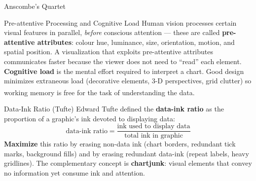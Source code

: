 \begin{v3topic}{Anscombe's Quartet}
\begin{center}
\label{fig:viz-anscombe}
    \end{center}

\end{v3topic}
\begin{v3topic}{Pre-attentive Processing and Cognitive Load}
    Human vision processes certain visual features in parallel, \emph{before} conscious
    attention --- these are called \textbf{pre-attentive attributes}: colour hue, luminance,
    size, orientation, motion, and spatial position. A visualization that exploits
    pre-attentive attributes communicates faster because the viewer does not need to
    ``read'' each element.
    \textbf{Cognitive load} is the mental effort required to interpret a chart.
    Good design minimizes extraneous load (decorative elements, 3-D perspectives, grid
    clutter) so working memory is free for the task of understanding the
    data\textsuperscript{\cite[][pp.~25--40]{jansenHandbuchInfografik1999}}.

\end{v3topic}
\begin{v3topic}{Data-Ink Ratio (Tufte)}
    Edward Tufte defined the \textbf{data-ink ratio} as the proportion of a graphic's ink
    devoted to displaying data:
    \begin{equation}
        \text{data-ink ratio} = \frac{\text{ink used to display data}}{\text{total ink in graphic}}
    \end{equation}
    \textbf{Maximize} this ratio by erasing non-data ink (chart borders, redundant tick marks,
    background fills) and by erasing redundant data-ink (repeat labels, heavy gridlines).
    The complementary concept is \textbf{chartjunk}: visual elements that convey no
    information yet consume ink and attention.

\end{v3topic}
